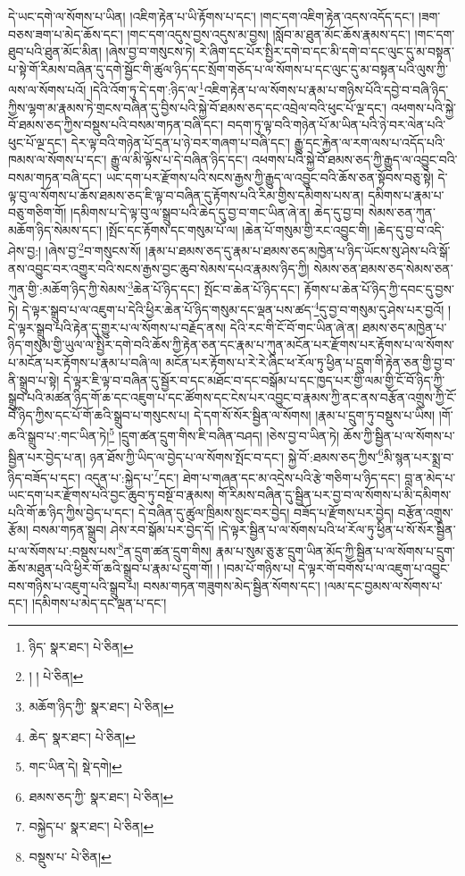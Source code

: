 དེ་ཡང་དགེ་ལ་སོགས་པ་ཡིན། །འཇིག་རྟེན་པ་ཡི་རྟོགས་པ་དང་། །གང་དག་འཇིག་རྟེན་འདས་འདོད་དང་། །ཟག་བཅས་ཟག་པ་མེད་ཆོས་དང་། །གང་དག་འདུས་བྱས་འདུས་མ་བྱས། །སློབ་མ་ཐུན་མོང་ཆོས་རྣམས་དང་། །གང་དག་ཐུབ་པའི་ཐུན་མོང་མིན། །ཞེས་བྱ་བ་གསུངས་ཏེ། རེ་ཞིག་དང་པོར་སྤྱིར་དགེ་བ་དང་མི་དགེ་བ་དང་ལུང་དུ་མ་བསྟན་པ་སྟེ་གོ་རིམས་བཞིན་དུ་དགེ་སྦྱོང་གི་ཚུལ་ཉིད་དང་སྲོག་གཅོད་པ་ལ་སོགས་པ་དང་ལུང་དུ་མ་བསྟན་པའི་ལུས་ཀྱི་ལས་ལ་སོགས་པའོ། །དེའི་འོག་ཏུ་དེ་དག་:ཉིད་ལ་\footnote{ཉིད་  སྣར་ཐང་།  པེ་ཅིན། }འཇིག་རྟེན་པ་ལ་སོགས་པ་རྣམ་པ་གཉིས་པོའི་དབྱེ་བ་བཞི་ཉིད་ཀྱིས་ལྷག་མ་རྣམས་ཏེ་གྲངས་བཞིན་དུ་བྱིས་པའི་སྐྱེ་བོ་ཐམས་ཅད་དང་འབྲེལ་བའི་ཕུང་པོ་ལྔ་དང་། འཕགས་པའི་སྐྱེ་བོ་ཐམས་ཅད་ཀྱིས་བསྡུས་པའི་བསམ་གཏན་བཞི་དང་། བདག་ཏུ་ལྟ་བའི་གཉེན་པོ་མ་ཡིན་པའི་ཉེ་བར་ལེན་པའི་ཕུང་པོ་ལྔ་དང་། དེར་ལྟ་བའི་གཉེན་པོ་དྲན་པ་ཉེ་བར་གཞག་པ་བཞི་དང་། རྒྱུ་དང་རྐྱེན་ལ་རག་ལས་པ་འདོད་པའི་ཁམས་ལ་སོགས་པ་དང་། རྒྱུ་ལ་མི་ལྟོས་པ་དེ་བཞིན་ཉིད་དང་། འཕགས་པའི་སྐྱེ་བོ་ཐམས་ཅད་ཀྱི་རྒྱུད་ལ་འབྱུང་བའི་བསམ་གཏན་བཞི་དང་། ཡང་དག་པར་རྫོགས་པའི་སངས་རྒྱས་ཀྱི་རྒྱུད་ལ་འབྱུང་བའི་ཆོས་ཅན་སྟོབས་བཅུ་སྟེ། དེ་ལྟ་བུ་ལ་སོགས་པ་ཆོས་ཐམས་ཅད་ཇི་ལྟ་བ་བཞིན་དུ་རྟོགས་པའི་རིམ་གྱིས་དམིགས་པས་ན། དམིགས་པ་རྣམ་པ་བཅུ་གཅིག་གོ། །དམིགས་པ་དེ་ལྟ་བུ་ལ་སྒྲུབ་པའི་ཆེད་དུ་བྱ་བ་གང་ཡིན་ཞེ་ན། ཆེད་དུ་བྱ་བ། སེམས་ཅན་ཀུན་མཆོག་ཉིད་སེམས་དང་། །སྤོང་དང་རྟོགས་དང་གསུམ་པོ་ལ། །ཆེན་པོ་གསུམ་གྱི་རང་འབྱུང་གི། །ཆེད་དུ་བྱ་བ་འདི་ཤེས་བྱ:། །ཞེས་བྱ་\footnote{། །  པེ་ཅིན། }བ་གསུངས་སོ། །རྣམ་པ་ཐམས་ཅད་དུ་རྣམ་པ་ཐམས་ཅད་མཁྱེན་པ་ཉིད་ཡོངས་སུ་ཤེས་པའི་སྒོ་ནས་འབྱུང་བར་འགྱུར་བའི་སངས་རྒྱས་བྱང་ཆུབ་སེམས་དཔའ་རྣམས་ཉིད་ཀྱི། སེམས་ཅན་ཐམས་ཅད་སེམས་ཅན་ཀུན་གྱི་:མཆོག་ཉིད་ཀྱི་སེམས་\footnote{མཆོག་ཉིད་ཀྱི་  སྣར་ཐང་།  པེ་ཅིན། }ཆེན་པོ་ཉིད་དང་། སྤོང་བ་ཆེན་པོ་ཉིད་དང་། རྟོགས་པ་ཆེན་པོ་ཉིད་ཀྱི་དབང་དུ་བྱས་ཏེ། དེ་ལྟར་སྒྲུབ་པ་ལ་འཇུག་པ་དེའི་ཕྱིར་ཆེན་པོ་ཉིད་གསུམ་དང་ལྡན་པས་ཚད་\footnote{ཆེད་  སྣར་ཐང་།  པེ་ཅིན། }དུ་བྱ་བ་གསུམ་དུ་ཤེས་པར་བྱའོ། །དེ་ལྟར་སྒྲུབ་པའི་རྟེན་དུ་གྱུར་པ་ལ་སོགས་པ་བརྗོད་ནས། དེའི་རང་གི་ངོ་བོ་གང་ཡིན་ཞེ་ན། ཐམས་ཅད་མཁྱེན་པ་ཉིད་གསུམ་གྱི་ཡུལ་ལ་སྤྱིར་དགེ་བའི་ཆོས་ཀྱི་རྟེན་ཅན་དང་རྣམ་པ་ཀུན་མངོན་པར་རྫོགས་པར་རྟོགས་པ་ལ་སོགས་པ་མངོན་པར་རྟོགས་པ་རྣམ་པ་བཞི་ལ། མངོན་པར་རྟོགས་པ་རེ་རེ་ཞིང་ཕ་རོལ་ཏུ་ཕྱིན་པ་དྲུག་གི་རྟེན་ཅན་གྱི་བྱ་བ་ནི་སྒྲུབ་པ་སྟེ། དེ་ལྟར་ཇི་ལྟ་བ་བཞིན་དུ་སྦྱོར་བ་དང་མཐོང་བ་དང་བསྒོམ་པ་དང་ཁྱད་པར་གྱི་ལམ་གྱི་ངོ་བོ་ཉིད་ཀྱི་སྒྲུབ་པའི་མཚན་ཉིད་གོ་ཆ་དང་འཇུག་པ་དང་ཚོགས་དང་ངེས་པར་འབྱུང་བ་རྣམས་ཀྱི་ནང་ནས་བརྩོན་འགྲུས་ཀྱི་ངོ་བོ་ཉིད་ཀྱིས་དང་པོ་གོ་ཆའི་སྒྲུབ་པ་གསུངས་པ། དེ་དག་སོ་སོར་སྦྱིན་ལ་སོགས། །རྣམ་པ་དྲུག་ཏུ་བསྡུས་པ་ཡིས། །གོ་ཆའི་སྒྲུབ་པ་:གང་ཡིན་ཏེ།\footnote{གང་ཡིན་དེ།  སྡེ་དགེ། } །དྲུག་ཚན་དྲུག་གིས་ཇི་བཞིན་བཤད། །ཅེས་བྱ་བ་ཡིན་ཏེ། ཆོས་ཀྱི་སྦྱིན་པ་ལ་སོགས་པ་སྦྱིན་པར་བྱེད་པ་ན། ཉན་ཐོས་ཀྱི་ཡིད་ལ་བྱེད་པ་ལ་སོགས་སྤོང་བ་དང་། སྐྱེ་བོ་:ཐམས་ཅད་ཀྱིས་\footnote{ཐམས་ཅད་ཀྱི་  སྣར་ཐང་།  པེ་ཅིན། }མི་སྙན་པར་སྨྲ་བ་ཉིད་བཟོད་པ་དང་། འདུན་པ་:སྐྱེད་པ་\footnote{བསྐྱེད་པ་  སྣར་ཐང་།  པེ་ཅིན། }དང་། ཐེག་པ་གཞན་དང་མ་འདྲེས་པའི་རྩེ་གཅིག་པ་ཉིད་དང་། བླ་ན་མེད་པ་ཡང་དག་པར་རྫོགས་པའི་བྱང་ཆུབ་ཏུ་བསྔོ་བ་རྣམས། གོ་རིམས་བཞིན་དུ་སྦྱིན་པར་བྱ་བ་ལ་སོགས་པ་མི་དམིགས་པའི་གོ་ཆ་ཉིད་ཀྱིས་བྱེད་པ་དང་། དེ་བཞིན་དུ་ཚུལ་ཁྲིམས་སྲུང་བར་བྱེད། བཟོད་པ་རྫོགས་པར་བྱེད། བརྩོན་འགྲུས་རྩོམ། བསམ་གཏན་སྒྲུབ། ཤེས་རབ་སྒོམ་པར་བྱེད་དོ། །དེ་ལྟར་སྦྱིན་པ་ལ་སོགས་པའི་ཕ་རོལ་ཏུ་ཕྱིན་པ་སོ་སོར་སྦྱིན་པ་ལ་སོགས་པ་:བསྡུས་པས་\footnote{བསྡུས་པ་  པེ་ཅིན། }ན་དྲུག་ཚན་དྲུག་གིས། རྣམ་པ་སུམ་ཅུ་རྩ་དྲུག་ཡིན་མོད་ཀྱི་སྦྱིན་པ་ལ་སོགས་པ་དྲུག་ཆོས་མཐུན་པའི་ཕྱིར་གོ་ཆའི་སྒྲུབ་པ་རྣམ་པ་དྲུག་གོ། ། །བམ་པོ་གཉིས་པ། དེ་ལྟར་གོ་བགོས་པ་ལ་འཇུག་པ་འབྱུང་བས་གཉིས་པ་འཇུག་པའི་སྒྲུབ་པ། བསམ་གཏན་གཟུགས་མེད་སྦྱིན་སོགས་དང་། །ལམ་དང་བྱམས་ལ་སོགས་པ་དང་། །དམིགས་པ་མེད་དང་ལྡན་པ་དང་། 